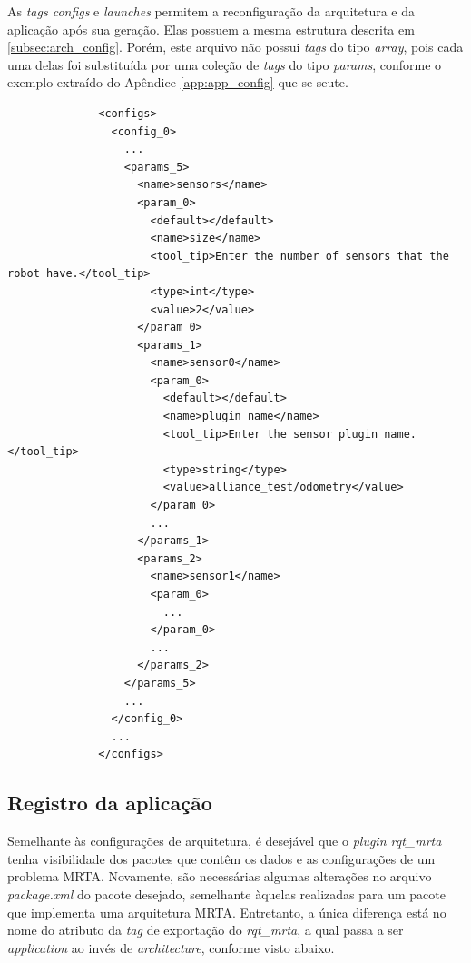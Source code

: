             As \textit{tags configs} e \textit{launches} permitem a reconfiguração da arquitetura e da aplicação após sua geração. Elas possuem a mesma estrutura descrita em \ref{subsec:arch_config}. Porém, este arquivo não possui \textit{tags} do tipo \textit{array}, pois cada uma delas foi substituída por uma coleção de \textit{tags} do tipo \textit{params}, conforme o exemplo extraído do Apêndice \ref{app:app_config} que se seute.
            
            \begin{lstlisting}
              <configs>
                <config_0>
                  ...
                  <params_5>
                    <name>sensors</name>
                    <param_0>
                      <default></default>
                      <name>size</name>
                      <tool_tip>Enter the number of sensors that the robot have.</tool_tip>
                      <type>int</type>
                      <value>2</value>
                    </param_0>
                    <params_1>
                      <name>sensor0</name>
                      <param_0>
                        <default></default>
                        <name>plugin_name</name>
                        <tool_tip>Enter the sensor plugin name.</tool_tip>
                        <type>string</type>
                        <value>alliance_test/odometry</value>
                      </param_0>
                      ...
                    </params_1>
                    <params_2>
                      <name>sensor1</name>
                      <param_0>
                        ...
                      </param_0>
                      ...
                    </params_2>
                  </params_5>
                  ...
                </config_0>
                ...
              </configs>
            \end{lstlisting}
            
        \subsection{Registro da aplicação} \label{subsec:app_config_rgst}
            Semelhante às configurações de arquitetura, é desejável que o \textit{plugin rqt\_mrta} tenha visibilidade dos pacotes que contêm os dados e as configurações de um problema MRTA. Novamente, são necessárias algumas alterações no arquivo \textit{package.xml} do pacote desejado, semelhante àquelas realizadas para um pacote que implementa uma arquitetura MRTA. Entretanto, a única diferença está no nome do atributo da \textit{tag} de exportação do \textit{rqt\_mrta}, a qual passa a ser \textit{application} ao invés de \textit{architecture}, conforme visto abaixo.
            
